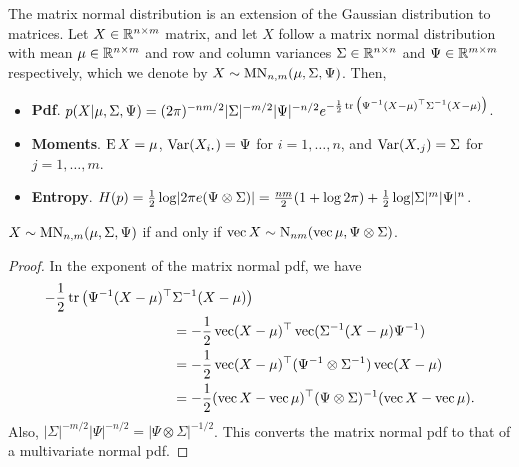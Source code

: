 The matrix normal distribution is an extension of the Gaussian distribution to matrices.
Let $X\in\bbR^{n \times m}$ matrix, and let $X$ follow a matrix normal distribution with mean $\mu\in\bbR^{n \times m}$ and row and column variances $\Sigma \in \bbR^{n \times n}$ and $\Psi \in \bbR^{m \times m}$ respectively, which we denote by $X\sim\MN_{n,m}(\mu,\Sigma,\Psi)$.
Then,
\begin{itemize}
  \item \textbf{Pdf}. $p(X|\mu,\Sigma,\Psi) = (2\pi)^{-nm/2}|\Sigma|^{-m/2}|\Psi|^{-n/2} e^{-\half \tr \big(\Psi^{-1}(X-\mu)^\top\Sigma^{-1}(X-\mu)\big)}$.
  \item \textbf{Moments}. $\E X=\mu$, $\Var(X_{i \bigcdot }) = \Psi$ for $i=1,\dots,n$, and $\Var(X_{\bigcdot j}) = \Sigma$ for $j=1,\dots,m$. 
  \item \textbf{Entropy}. $H(p) = \half \log \abs{2\pi e (\Psi \otimes \Sigma)} = \half[nm](1 + \log 2\pi) + \half\log\abs{\Sigma}^m\abs{\Psi}^n$.
\end{itemize}

\begin{lemma}
  $X\sim\MN_{n,m}(\mu,\Sigma,\Psi)$ if and only if $\vecc X\sim \N_{nm}(\vecc\mu,\Psi \otimes \Sigma)$.
\end{lemma}

\begin{proof}
  In the exponent of the matrix normal pdf, we have
  \begin{align*}
    -\half \tr \big(\Psi^{-1}(X-\mu)^\top &\Sigma^{-1}(X-\mu)\big) \\
    &= -\half \vecc(X-\mu)^\top \vecc(\Sigma^{-1}(X-\mu)\Psi^{-1}) \\
    &= -\half \vecc(X-\mu)^\top (\Psi^{-1} \otimes \Sigma^{-1}) \vecc(X-\mu) \\
    &= -\half (\vecc X- \vecc \mu)^\top (\Psi \otimes \Sigma)^{-1} (\vecc X- \vecc \mu).     
  \end{align*} 
  Also, $|\Sigma|^{-m/2}|\Psi|^{-n/2} = |\Psi \otimes \Sigma|^{-1/2}$.
  This converts the matrix normal pdf to that of a multivariate normal pdf.
\end{proof}

